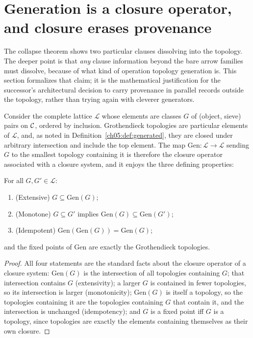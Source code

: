 \section{Generation is a closure operator, and closure erases
provenance}\label{ch05:sec:closure}

The collapse theorem shows two particular clauses dissolving into the
topology. The deeper point is that \emph{any} clause information beyond the
bare arrow families must dissolve, because of what kind of operation
topology generation is. This section formalizes that claim; it is the
mathematical justification for the successor's architectural decision to
carry provenance in parallel records outside the topology, rather than
trying again with cleverer generators.

Consider the complete lattice $\mathcal{L}$ whose elements are classes $G$ of
(object, sieve) pairs on $\mathcal{C}$, ordered by inclusion. Grothendieck topologies
are particular elements of $\mathcal{L}$, and, as noted in
Definition~\ref{ch05:def:generated}, they are closed under arbitrary
intersection and include the top element. The map
$\mathrm{Gen}:\mathcal{L}\to\mathcal{L}$ sending $G$ to the smallest topology
containing it is therefore the closure operator associated with a closure
system, and it enjoys the three defining properties:

\begin{proposition}\label{ch05:prop:closure}
For all $G,G'\in\mathcal{L}$:
\begin{enumerate}
\item (Extensive) $G\subseteq\mathrm{Gen}(G)$;
\item (Monotone) $G\subseteq G'$ implies
$\mathrm{Gen}(G)\subseteq\mathrm{Gen}(G')$;
\item (Idempotent) $\mathrm{Gen}(\mathrm{Gen}(G))=\mathrm{Gen}(G)$;
\end{enumerate}
and the fixed points of $\mathrm{Gen}$ are exactly the Grothendieck
topologies.
\end{proposition}

\begin{proof}
All four statements are the standard facts about the closure operator of a
closure system: $\mathrm{Gen}(G)$ is the intersection of all topologies
containing $G$; that intersection contains $G$ (extensivity); a larger $G$
is contained in fewer topologies, so its intersection is larger
(monotonicity); $\mathrm{Gen}(G)$ is itself a topology, so the topologies
containing it are the topologies containing $G$ that contain it, and the
intersection is unchanged (idempotency); and $G$ is a fixed point iff $G$ is
a topology, since topologies are exactly the elements containing themselves
as their own closure.
\end{proof}

